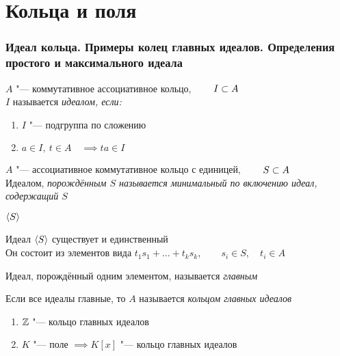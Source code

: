 \part{Кольца и поля}

\section{Идеал кольца. Примеры колец главных идеалов. Определения простого и максимального идеала}

\begin{definition}
	$ A $ "--- коммутативное ассоциативное кольцо, $ \qquad I \subset A $ \\
	$ I $ называется \it{идеалом}, если:
	\begin{enumerate}
		\item $ I $ "--- подгруппа по сложению
		\item $ a \in I, ~ t \in A \quad \implies ta \in I $
	\end{enumerate}
\end{definition}

\begin{definition}
	$ A $ "--- ассоциативное коммутативное кольцо с единицей, $ \qquad S \subset A $ \\
	Идеалом, \it{порождённым} $ S $ называется минимальный по включению идеал, содержащий $ S $
\end{definition}

\begin{notation}
	$ \Braket{S} $
\end{notation}

\begin{property}
	Идеал $ \Braket{S} $ существует и единственный \\
	Он состоит из элементов вида $ t_1s_1 + \dots + t_ks_k, \qquad s_i \in S, \quad t_i \in A $
\end{property}

\begin{noproof}
\end{noproof}

\begin{definition}
	Идеал, порождённый одним элементом, называется \it{главным}
\end{definition}

\begin{definition}
	Если все идеалы главные, то $ A $ называется \it{кольцом главных идеалов}
\end{definition}

\begin{theorem}
	\hfill
	\begin{enumerate}
		\item $ \mathbb{Z} $ "--- кольцо главных идеалов

		\item $ K $ "--- поле $ \implies K[x] $ "--- кольцо главных идеалов
	\end{enumerate}
\end{theorem}

